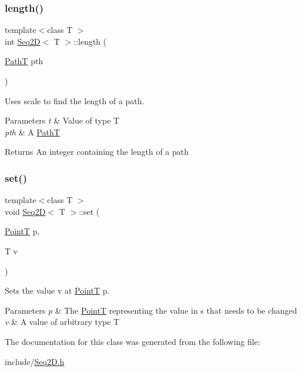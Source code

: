 \subsubsection{\texorpdfstring{length()}{length()}}
{\footnotesize\ttfamily template$<$class T $>$ \\
int \mbox{\hyperlink{class_seq2_d}{Seq2D}}$<$ T $>$\+::length (\begin{DoxyParamCaption}\item[{\mbox{\hyperlink{class_path_t}{PathT}}}]{pth }\end{DoxyParamCaption})}



Uses scale to find the length of a path. 


\begin{DoxyParams}{Parameters}
{\em t} & Value of type T \\
\hline
{\em pth} & A \mbox{\hyperlink{class_path_t}{PathT}} \\
\hline
\end{DoxyParams}
\begin{DoxyReturn}{Returns}
An integer containing the length of a path 
\end{DoxyReturn}
\mbox{\label{class_seq2_d_aac0f9bedacb88caa2e748a07a81639d5}} 
\subsubsection{\texorpdfstring{set()}{set()}}
{\footnotesize\ttfamily template$<$class T $>$ \\
void \mbox{\hyperlink{class_seq2_d}{Seq2D}}$<$ T $>$\+::set (\begin{DoxyParamCaption}\item[{\mbox{\hyperlink{class_point_t}{PointT}}}]{p,  }\item[{T}]{v }\end{DoxyParamCaption})}



Sets the value v at \mbox{\hyperlink{class_point_t}{PointT}} p. 


\begin{DoxyParams}{Parameters}
{\em p} & The \mbox{\hyperlink{class_point_t}{PointT}} representing the value in s that needs to be changed \\
\hline
{\em v} & A value of arbitrary type T \\
\hline
\end{DoxyParams}


The documentation for this class was generated from the following file\+:\begin{DoxyCompactItemize}
\item 
include/\mbox{\hyperlink{_seq2_d_8h}{Seq2\+D.\+h}}\end{DoxyCompactItemize}
